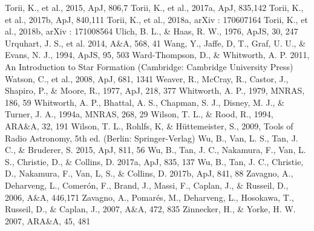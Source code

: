 \documentclass[onecolumn]{pasj01}
\begin{document}
{{{{{{\begin{thebibliography}{}
Torii, K., et al., 2015, ApJ, 806,7
Torii, K., et al., 2017a, ApJ, 835,142
Torii, K., et al., 2017b, ApJ, 840,111
Torii, K., et al., 2018a, arXiv : 170607164
Torii, K., et al., 2018b, arXiv : 171008564
{ Ulich, B. L., \& Haas, R. W., 1976, ApJS, 30, 247}
Urquhart, J. S., et al. 2014, A\&A, 568, 41
Wang, Y., Jaffe, D, T., Graf, U. U., \& Evans, N. J., 1994, ApJS, 95, 503 
{Ward-Thompson, D., \& Whitworth, A. P. 2011, An Introduction to Star Formation (Cambridge: Cambridge University Press)}
{Watson, C., et al., 2008, ApJ, 681, 1341}
Weaver, R., McCray, R., Castor, J., Shapiro, P., \& Moore, R., 1977, ApJ, 218, 377
Whitworth, A. P., 1979, MNRAS, 186, 59
Whitworth, A. P., Bhattal, A. S., Chapman, S. J., Disney, M. J., \& Turner, J. A., 1994a, MNRAS, 268, 29
Wilson, T. L., \& Rood, R., 1994, ARA\&A, 32, 191 
{ Wilson, T. L., Rohlfs, K, \& H\"{u}ttemeister, S., 2009, Tools of Radio Astronomy, 5th ed. (Berlin: Springer-Verlag)}
Wu, B., Van, L. S., Tan, J. C., \& Bruderer, S. 2015, ApJ, 811, 56 
Wu, B., Tan, J. C., Nakamura, F., Van, L. S., Christie, D., \& Collins, D. 2017a, ApJ, 835, 137 
Wu, B., Tan, J. C., Christie, D., Nakamura, F., Van, L, S., \& Collins, D. 2017b, ApJ, 841, 88 
Zavagno, A., Deharveng, L., Comer\'on, F., Brand, J., Massi, F., Caplan, J., \& Russeil, D., 2006, A\&A, 446,171
Zavagno, A., Pomar\'es, M., Deharveng, L., Hosokawa, T., Russeil, D., \& Caplan, J., 2007, A\&A, 472, 835
Zinnecker, H., \& Yorke, H. W. 2007, ARA\&A, 45, 481
\end{thebibliography}

}}}}}}
\end{document}
